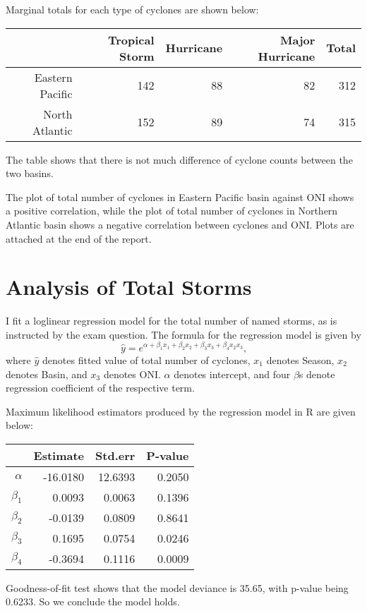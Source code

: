 \documentclass[12pt,a4paper]{article}
\begin{document}
Marginal totals for each type of cyclones are shown below:

\bigskip
\begin{tabular}{r|rrrr}
	& Tropical Storm & Hurricane & Major Hurricane & Total\\  \hline
	Eastern Pacific & 142 & 88 & 82 & 312\\
	North Atlantic &152&89&74&315

\end{tabular}

The table shows that there is not much difference of cyclone counts between the two basins.

The plot of total number of cyclones in Eastern Pacific basin against ONI shows a positive correlation, while the plot of total number of cyclones in Northern Atlantic basin shows a negative correlation between cyclones and ONI. Plots are attached at the end of the report.
\bigskip

\section{Analysis of Total Storms}
I fit a loglinear regression model for the total number of named storms, as is instructed by the exam question. The formula for the regression model is given by
 $$\hat{y}=e^{\alpha+\beta_1x_1 + \beta_2x_2+\beta_3x_3+\beta_4x_2x_3}\text{,} $$
where $\hat{y}$ denotes fitted value of total number of cyclones, $x_{1}$ denotes Season, $x_{2}$ denotes Basin, and $x_{3}$ denotes ONI. $\alpha$ denotes intercept, and four $\beta$s denote regression coefficient of the respective term.

Maximum likelihood estimators produced by the regression model in R are given below:\\
\bigskip
\begin{center}
\begin{tabular}{r|rrr}
	& Estimate & Std.err & P-value\\ \hline
	$\alpha$ &-16.0180 &12.6393 &0.2050 \\
	$\beta_1$ &0.0093 &0.0063 & 0.1396\\
	$\beta_2$ &-0.0139 &0.0809 & 0.8641\\
	$\beta_3$ &0.1695 & 0.0754& 0.0246\\
	$\beta_4$ &-0.3694 &0.1116 & 0.0009\\
\end{tabular}
\end{center}
Goodness-of-fit test shows that the model deviance is 35.65, with p-value being 0.6233. So we conclude the model holds.
\end{document}
